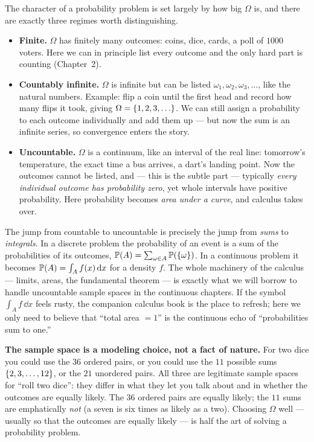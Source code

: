 The character of a probability problem is set largely by how big $\Omega$ is, and
there are exactly three regimes worth distinguishing.

\begin{itemize}
\item \textbf{Finite.} $\Omega$ has finitely many outcomes: coins, dice, cards, a
poll of $1000$ voters. Here we can in principle list every outcome and the only
hard part is counting (Chapter~2).
\item \textbf{Countably infinite.} $\Omega$ is infinite but can be listed
$\omega_1, \omega_2, \omega_3, \dots$, like the natural numbers. Example: flip a
coin until the first head and record how many flips it took, giving
$\Omega = \set{1, 2, 3, \dots}$. We can still assign a probability to each
outcome individually and add them up --- but now the sum is an infinite series,
so convergence enters the story.
\item \textbf{Uncountable.} $\Omega$ is a continuum, like an interval of the real
line: tomorrow's temperature, the exact time a bus arrives, a dart's landing
point. Now the outcomes cannot be listed, and --- this is the subtle part ---
typically \emph{every individual outcome has probability zero}, yet whole
intervals have positive probability. Here probability becomes \emph{area under a
curve}, and calculus takes over.
\end{itemize}

\begin{connectionbox}
The jump from countable to uncountable is precisely the jump from \emph{sums} to
\emph{integrals}. In a discrete problem the probability of an event is a sum of
the probabilities of its outcomes, $\operatorname{\mathbb{P}}(A) = \sum_{\omega \in A} \operatorname{\mathbb{P}}(\{\omega\})$.
In a continuous problem it becomes $\operatorname{\mathbb{P}}(A) = \int_A f(x)\,\mathrm{d} x$ for a density
$f$. The whole machinery of the calculus --- limits, areas, the fundamental
theorem --- is exactly what we will borrow to handle uncountable sample spaces in
the continuous chapters. If the symbol $\int_A f\,\dd x$ feels rusty, the
companion calculus book is the place to refresh; here we only need to believe
that ``total area $=1$'' is the continuous echo of ``probabilities sum to one.''
\end{connectionbox}

\begin{trapbox}
\textbf{The sample space is a modeling choice, not a fact of nature.} For two
dice you could use the $36$ ordered pairs, or you could use the $11$ possible
sums $\{2,3,\dots,12\}$, or the $21$ unordered pairs. All three are legitimate
sample spaces for ``roll two dice'': they differ in what they let you talk about
and in whether the outcomes are equally likely. The $36$ ordered pairs are
equally likely; the $11$ sums are emphatically \emph{not} (a seven is six times as
likely as a two). Choosing $\Omega$ well --- usually so that the outcomes are
equally likely --- is half the art of solving a probability problem.
\end{trapbox}


